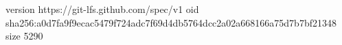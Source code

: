 version https://git-lfs.github.com/spec/v1
oid sha256:a0d7fa9f9ecac5479f724adc7f69d4db5764dcc2a02a668166a75d7b7bf21348
size 5290
